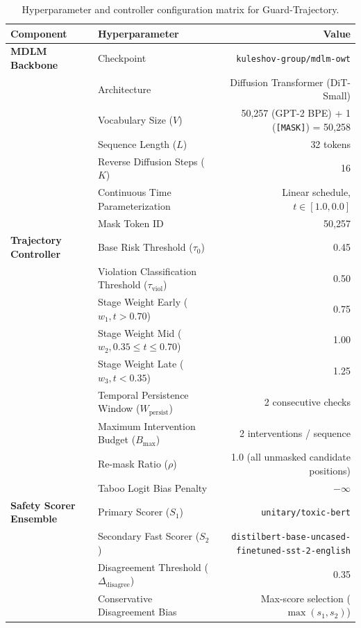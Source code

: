 \documentclass[conference]{IEEEtran}
\begin{document}
\begin{table}[h]
\centering
\small
\begin{tabular}{llr}
\toprule
\textbf{Component} & \textbf{Hyperparameter} & \textbf{Value} \\
\midrule
\textbf{MDLM Backbone} & Checkpoint & \texttt{kuleshov-group/mdlm-owt} \\
& Architecture & Diffusion Transformer (DiT-Small) \\
& Vocabulary Size ($V$) & 50,257 (GPT-2 BPE) + 1 (\texttt{[MASK]}) = 50,258 \\
& Sequence Length ($L$) & 32 tokens \\
& Reverse Diffusion Steps ($K$) & 16 \\
& Continuous Time Parameterization & Linear schedule, $t \in [1.0, 0.0]$ \\
& Mask Token ID & 50,257 \\
\midrule
\textbf{Trajectory Controller} & Base Risk Threshold ($\tau_0$) & 0.45 \\
& Violation Classification Threshold ($\tau_{\text{viol}}$) & 0.50 \\
& Stage Weight Early ($w_1, t > 0.70$) & 0.75 \\
& Stage Weight Mid ($w_2, 0.35 \le t \le 0.70$) & 1.00 \\
& Stage Weight Late ($w_3, t < 0.35$) & 1.25 \\
& Temporal Persistence Window ($W_{\text{persist}}$) & 2 consecutive checks \\
& Maximum Intervention Budget ($B_{\text{max}}$) & 2 interventions / sequence \\
& Re-mask Ratio ($\rho$) & 1.0 (all unmasked candidate positions) \\
& Taboo Logit Bias Penalty & $-\infty$ \\
\midrule
\textbf{Safety Scorer Ensemble} & Primary Scorer ($S_1$) & \texttt{unitary/toxic-bert} \\
& Secondary Fast Scorer ($S_2$) & \texttt{distilbert-base-uncased-finetuned-sst-2-english} \\
& Disagreement Threshold ($\Delta_{\text{disagree}}$) & 0.35 \\
& Conservative Disagreement Bias & Max-score selection ($\max(s_1, s_2)$) \\
\bottomrule
\end{tabular}
\caption{Hyperparameter and controller configuration matrix for Guard-Trajectory.}
\label{tab:app_hyperparams}
\end{table}
\end{document}
